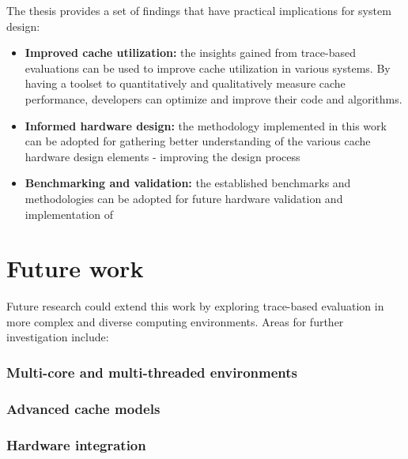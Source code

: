 The thesis provides a set of findings that have practical implications for system design:

\begin{itemize}
	\item \textbf{Improved cache utilization:} the insights gained from trace-based evaluations can be used to improve cache utilization in various systems. By having a toolset to
		quantitatively and qualitatively measure cache performance, developers can optimize and improve their code and algorithms.
	\item \textbf{Informed hardware design:} the methodology implemented in this work can be adopted for gathering better understanding of the various cache hardware design elements -
		improving the design process
	\item \textbf{Benchmarking and validation:} the established benchmarks and methodologies can be adopted for future hardware validation and implementation of 
\end{itemize}

\section{Future work}

Future research could extend this work by exploring trace-based evaluation in more complex and diverse computing environments. Areas for further investigation include:

\subsubsection*{Multi-core and multi-threaded environments}

\subsubsection*{Advanced cache models}

\subsubsection*{Hardware integration}
